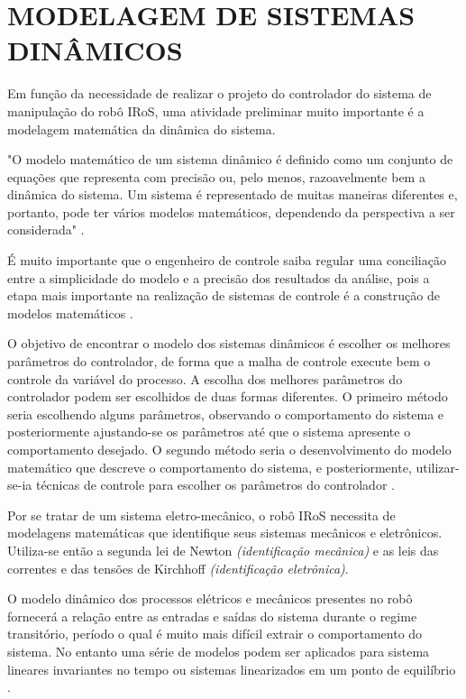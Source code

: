 \documentclass[12pt,oneside,a4paper, chapter=TITLE, section = TITLE, english, brazil]{abntex2}
\begin{document}

\chapter{MODELAGEM DE SISTEMAS DINÂMICOS}

Em função da necessidade de realizar o projeto do controlador do sistema de manipulação do robô IRoS, uma atividade preliminar muito importante é a modelagem matemática da dinâmica do sistema.

\begin{citacao}
"O modelo matemático de um sistema dinâmico é definido como um conjunto de equações que representa com precisão ou, pelo menos,  razoavelmente bem a dinâmica do sistema. Um sistema é representado de muitas maneiras diferentes e, portanto, pode ter vários modelos matemáticos, dependendo da perspectiva a ser considerada" \cite{ogata}.
\end{citacao}

É muito importante que o engenheiro de controle saiba regular uma conciliação entre a simplicidade do modelo e a precisão dos resultados da análise, pois a etapa mais importante na realização de sistemas de controle é a construção de modelos matemáticos \cite{ogata}.

O objetivo de encontrar o modelo dos sistemas dinâmicos é escolher os melhores parâmetros do controlador, de forma que a malha de controle execute bem o controle da variável do processo. A escolha dos melhores parâmetros do controlador podem ser escolhidos de duas formas diferentes. O primeiro método seria escolhendo alguns parâmetros, observando o comportamento do sistema e posteriormente ajustando-se os parâmetros até que o sistema apresente o comportamento desejado. O segundo método seria o desenvolvimento do modelo matemático que descreve o comportamento do sistema, e posteriormente, utilizar-se-ia técnicas de controle para escolher os parâmetros do controlador \cite{astrom}.

Por se tratar de um sistema eletro-mecânico, o robô IRoS necessita de modelagens matemáticas que identifique seus sistemas mecânicos e eletrônicos. Utiliza-se então a segunda lei de Newton \textit{(identificação mecânica)} e as leis das correntes e das tensões de Kirchhoff \textit{(identificação eletrônica)}.

O modelo dinâmico dos processos elétricos e mecânicos presentes no robô fornecerá a relação entre as entradas e saídas do sistema durante o regime transitório, período o qual é muito mais difícil extrair o comportamento do sistema. No entanto uma série de modelos podem ser aplicados para sistema lineares invariantes no tempo ou sistemas linearizados em um ponto de equilíbrio \cite{astrom}.
\end{document}
